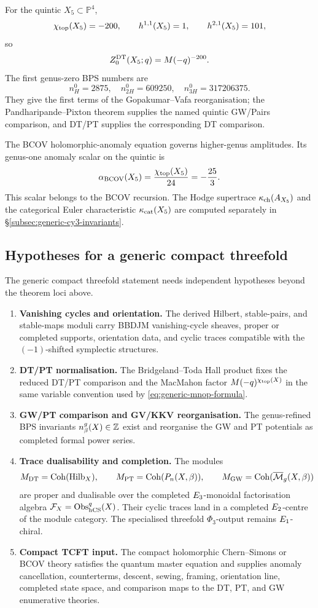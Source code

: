 For the quintic \(X_5\subset\mathbb P^4\),
\[
  \chi_{\mathrm{top}}(X_5)=-200,\qquad
  h^{1,1}(X_5)=1,\qquad
  h^{2,1}(X_5)=101,
\]
so
\begin{equation}
  Z^{\mathrm{DT}}_{0}(X_5;q)=M(-q)^{-200}.
  \label{eq:quintic-degree-zero}
\end{equation}
The first genus-zero BPS numbers are
\[
  n^0_H=2875,\quad
  n^0_{2H}=609250,\quad
  n^0_{3H}=317206375.
\]
They give the first terms of the Gopakumar--Vafa reorganisation; the
Pandharipande--Pixton theorem supplies the named quintic GW/Pairs
comparison, and DT/PT supplies the corresponding DT comparison.

The BCOV holomorphic-anomaly equation governs higher-genus amplitudes.
Its genus-one anomaly scalar on the quintic is
\[
  \alpha_{\mathrm{BCOV}}(X_5)=\frac{\chi_{\mathrm{top}}(X_5)}{24}=-\frac{25}{3}.
\]
This scalar belongs to the BCOV recursion.  The Hodge supertrace
\(\kappa_{\mathrm{ch}}(A_{X_5})\) and the categorical Euler characteristic
\(\kappa_{\mathrm{cat}}(X_5)\) are computed separately in
\S\ref{subsec:generic-cy3-invariants}.

\subsection{Hypotheses for a generic compact threefold}

The generic compact threefold statement needs independent hypotheses
beyond the theorem loci above.
\begin{enumerate}
\item \textbf{Vanishing cycles and orientation.}
  The derived Hilbert, stable-pairs, and stable-maps moduli carry
  BBDJM vanishing-cycle sheaves, proper or completed supports,
  orientation data, and cyclic traces compatible with the
  \((-1)\)-shifted symplectic structures.
\item \textbf{DT/PT normalisation.}
  The Bridgeland--Toda Hall product fixes the reduced DT/PT comparison
  and the MacMahon factor \(M(-q)^{\chi_{\mathrm{top}}(X)}\) in the same
  variable convention used by \eqref{eq:generic-mnop-formula}.
\item \textbf{GW/PT comparison and GV/KKV reorganisation.}
  The genus-refined BPS invariants \(n^g_\beta(X)\in\mathbb{Z}\) exist and
  reorganise the GW and PT potentials as completed formal power series.
\item \textbf{Trace dualisability and completion.}
  The modules
  \[
    M_{\mathrm{DT}}=\mathrm{Coh}(\mathrm{Hilb}_X),\qquad
    M_{\mathrm{PT}}=\mathrm{Coh}(P_n(X,\beta)),\qquad
    M_{\mathrm{GW}}=\mathrm{Coh}(\overline{\mathcal{M}}_g(X,\beta))
  \]
  are proper and dualisable over the completed \(E_3\)-monoidal
  factorisation algebra
  \(\mathcal{F}_X=\mathrm{Obs}^q_{\mathrm{hCS}}(X)\).  Their cyclic traces land in a completed
  \(E_2\)-centre of the module category.  The specialised threefold
  \(\Phi_3\)-output remains \(E_1\)-chiral.
\item \textbf{Compact TCFT input.}
  The compact holomorphic Chern--Simons or BCOV theory satisfies the
  quantum master equation and supplies anomaly cancellation,
  counterterms, descent, sewing, framing, orientation line, completed
  state space, and comparison maps to the DT, PT, and GW enumerative
  theories.
\end{enumerate}

